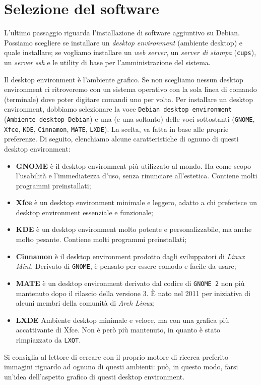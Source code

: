 \section{Selezione del software}
L'ultimo passaggio riguarda l'installazione di software aggiuntivo su Debian. Possiamo scegliere se installare un \textit{desktop environment} (ambiente desktop) e quale installare; se vogliamo installare un \textit{web server}, un \textit{server di stampa} (\texttt{cups}), un \textit{server ssh} e le utility di base per l'amministrazione del sistema.

Il desktop environment è l'ambiente grafico. Se non scegliamo nessun desktop environment ci ritroveremo con un sistema operativo con la sola linea di comando (terminale) dove poter digitare comandi uno per volta. Per installare un desktop environment, dobbiamo selezionare la voce \texttt{Debian desktop environment} (\texttt{Ambiente desktop Debian}) e una (e una soltanto) delle voci sottostanti (\texttt{GNOME}, \texttt{Xfce}, \texttt{KDE}, \texttt{Cinnamon}, \texttt{MATE}, \texttt{LXDE}). La scelta, va fatta in base alle proprie preferenze. Di seguito, elenchiamo alcune caratteristiche di ognuno di questi desktop environment:
\begin{itemize}
	\item \textbf{GNOME} è il desktop environment più utilizzato al mondo. Ha come scopo l'usabilità e l'immediatezza d'uso, senza rinunciare all'estetica. Contiene molti programmi preinstallati;
	\item \textbf{Xfce} è un desktop environment minimale e leggero, adatto a chi preferisce un desktop environment essenziale e funzionale;
	\item \textbf{KDE} è un desktop environment molto potente e personalizzabile, ma anche molto pesante. Contiene molti programmi preinstallati;
	\item \textbf{Cinnamon} è il desktop environment prodotto dagli sviluppatori di \textit{Linux Mint}. Derivato di \texttt{GNOME}, è pensato per essere comodo e facile da usare;
	\item \textbf{MATE} è un desktop environment derivato dal codice di \texttt{GNOME 2} non più mantenuto dopo il rilascio della versione 3. È nato nel 2011 per iniziativa di alcuni membri della comunità di \textit{Arch Linux};
	\item \textbf{LXDE} Ambiente desktop minimale e veloce, ma con una grafica più accattivante di Xfce. Non è però più mantenuto, in quanto è stato rimpiazzato da \texttt{LXQT}.
\end{itemize}
Si consiglia al lettore di cercare con il proprio motore di ricerca preferito immagini riguardo ad ognuno di questi ambienti: può, in questo modo, farsi un'idea dell'aspetto grafico di questi desktop environment.

